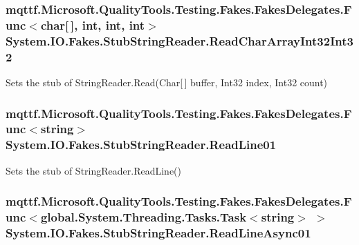 \hypertarget{class_system_1_1_i_o_1_1_fakes_1_1_stub_string_reader_ac2938d235efdc95cc6291d3b7798e5c7}{
\subsubsection[{Read\-Char\-Array\-Int32\-Int32}]{\setlength{\rightskip}{0pt plus 5cm}mqttf.\-Microsoft.\-Quality\-Tools.\-Testing.\-Fakes.\-Fakes\-Delegates.\-Func$<$char\mbox{[}$\,$\mbox{]}, int, int, int$>$ System.\-I\-O.\-Fakes.\-Stub\-String\-Reader.\-Read\-Char\-Array\-Int32\-Int32}}\label{class_system_1_1_i_o_1_1_fakes_1_1_stub_string_reader_ac2938d235efdc95cc6291d3b7798e5c7}


Sets the stub of String\-Reader.\-Read(\-Char\mbox{[}$\,$\mbox{]} buffer, Int32 index, Int32 count)

\hypertarget{class_system_1_1_i_o_1_1_fakes_1_1_stub_string_reader_a9476ae9572e6d6fe3b626b6b58448786}{
\subsubsection[{Read\-Line01}]{\setlength{\rightskip}{0pt plus 5cm}mqttf.\-Microsoft.\-Quality\-Tools.\-Testing.\-Fakes.\-Fakes\-Delegates.\-Func$<$string$>$ System.\-I\-O.\-Fakes.\-Stub\-String\-Reader.\-Read\-Line01}}\label{class_system_1_1_i_o_1_1_fakes_1_1_stub_string_reader_a9476ae9572e6d6fe3b626b6b58448786}


Sets the stub of String\-Reader.\-Read\-Line()

\hypertarget{class_system_1_1_i_o_1_1_fakes_1_1_stub_string_reader_ace0a88b1c1965b0550c772893ec166bb}{
\subsubsection[{Read\-Line\-Async01}]{\setlength{\rightskip}{0pt plus 5cm}mqttf.\-Microsoft.\-Quality\-Tools.\-Testing.\-Fakes.\-Fakes\-Delegates.\-Func$<$global.\-System.\-Threading.\-Tasks.\-Task$<$string$>$ $>$ System.\-I\-O.\-Fakes.\-Stub\-String\-Reader.\-Read\-Line\-Async01}}\label{class_system_1_1_i_o_1_1_fakes_1_1_stub_string_reader_ace0a88b1c1965b0550c772893ec166bb}


